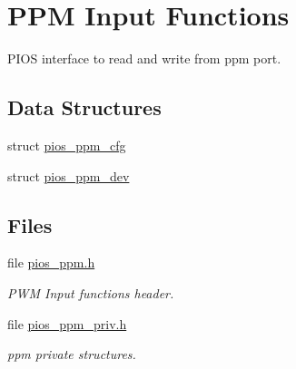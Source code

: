 \hypertarget{group___p_i_o_s___p_p_m}{\section{\-P\-P\-M \-Input \-Functions}
\label{group___p_i_o_s___p_p_m}
}


\-P\-I\-O\-S interface to read and write from ppm port.  


\subsection*{\-Data \-Structures}
\begin{DoxyCompactItemize}
\item 
struct \hyperlink{structpios__ppm__cfg}{pios\-\_\-ppm\-\_\-cfg}
\item 
struct \hyperlink{structpios__ppm__dev}{pios\-\_\-ppm\-\_\-dev}
\end{DoxyCompactItemize}
\subsection*{\-Files}
\begin{DoxyCompactItemize}
\item 
file \hyperlink{pios__ppm_8h}{pios\-\_\-ppm.\-h}
\begin{DoxyCompactList}\small\item\em \-P\-W\-M \-Input functions header. \end{DoxyCompactList}\item 
file \hyperlink{pios__ppm__priv_8h}{pios\-\_\-ppm\-\_\-priv.\-h}
\begin{DoxyCompactList}\small\item\em ppm private structures. \end{DoxyCompactList}\end{DoxyCompactItemize}
